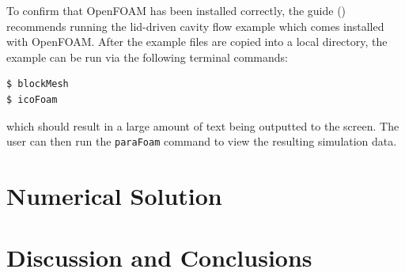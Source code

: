 \documentclass[twocolumn,10pt]{asme2ej}
\begin{document}
To confirm that OpenFOAM has been installed correctly, the guide (\cite{ctfm_1}) recommends running the lid-driven cavity flow example which comes installed with OpenFOAM. After the example files are copied into a local directory, the example can be run via the following terminal commands:
\begin{lstlisting}[language=sh]
$ blockMesh
$ icoFoam
\end{lstlisting}
which should result in a large amount of text being outputted to the screen. The user can then run the \lstinline[language=sh]`paraFoam` command to view the resulting simulation data.

\section{Numerical Solution}

\section{Discussion and Conclusions}

\nocite{*}

\hfill \break





\clearpage
\onecolumn
\appendix       %
\end{document}
